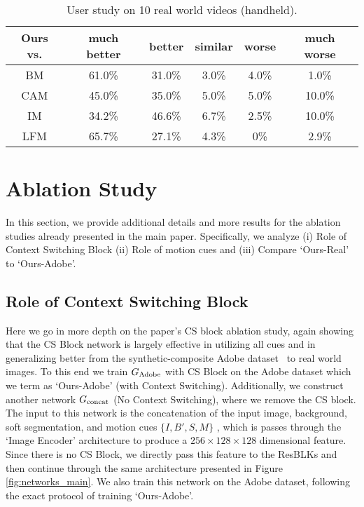 \documentclass[10pt,twocolumn,letterpaper]{article}
\begin{document}
\begin{table}[!h]
\setlength\tabcolsep{2pt}
	\centering
	\small
	\captionsetup{justification=centering}
\begin{tabular}{c|ccccc}
			\toprule
			 Ours vs. &  much better & better & similar & worse & much worse \\ 
			 \midrule
			 BM & 61.0\% & 31.0\% & 3.0\% & 4.0\% & 1.0\% \\
			 CAM & 45.0\% & 35.0\% & 5.0\% & 5.0\% & 10.0\%\\
			 IM & 34.2\% & 46.6\% & 6.7\% & 2.5\% & 10.0\%\\
			 LFM & 65.7\% & 27.1\% & 4.3\% & 0\% & 2.9\%\\
			\bottomrule
		\end{tabular}
		\vspace{0.5em}
		\caption{\small User study on 10 real world videos (handheld).}
\label{tab:real-hand1}
\end{table}



\section{Ablation Study}
\label{sec:abla_sup}


In this section, we provide additional details and more results for the ablation studies already presented in the main paper. Specifically, we analyze (i) Role of Context Switching Block (ii) Role of motion cues and (iii) Compare `Ours-Real' to `Ours-Adobe'.

\subsection{Role of Context Switching Block}
\label{sec:cs_block}
Here we go in more depth on the paper's CS block ablation study, again showing that the CS Block network is largely effective in utilizing all cues and in generalizing better from the synthetic-composite Adobe dataset~\cite{xu2017deep} to real world images. To this end we train $G_{\rm Adobe}$ with CS Block on the Adobe dataset which we term as `Ours-Adobe' (with Context Switching). Additionally, we construct another network $G_{\rm concat}$ (No Context Switching), where we remove the CS block. The input to this network is the concatenation of the input image, background, soft segmentation, and motion cues $\{I,B',S,M\}$ , which is passes through the `Image Encoder' architecture to produce a $256 \times 128 \times 128$ dimensional feature. Since there is no CS  Block, we directly pass this feature to the ResBLKs and then continue through the same architecture presented in Figure \ref{fig:networks_main}. We also train this network on the Adobe dataset, following the exact protocol of training `Ours-Adobe'.
\end{document}
